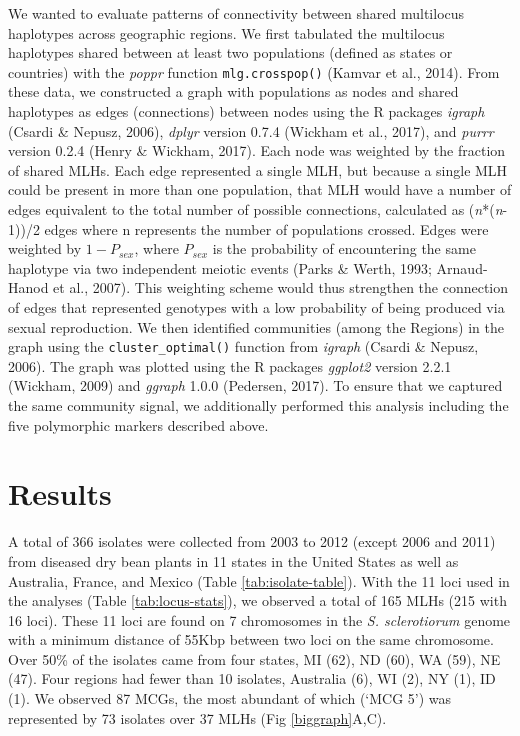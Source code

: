 \documentclass[fleqn,10pt,lineno]{wlpeerj} %
\theoremstyle{definition}
\theoremstyle{definition}
\theoremstyle{definition}
\theoremstyle{remark}
\begin{document}
We wanted to evaluate patterns of connectivity between shared multilocus
haplotypes across geographic regions. We first tabulated the multilocus
haplotypes shared between at least two populations (defined as states or
countries) with the \emph{poppr} function \texttt{mlg.crosspop()}
(Kamvar et al., 2014). From these data, we constructed a graph with
populations as nodes and shared haplotypes as edges (connections)
between nodes using the R packages \emph{igraph} (Csardi \& Nepusz,
2006), \emph{dplyr} version 0.7.4 (Wickham et al., 2017), and
\emph{purrr} version 0.2.4 (Henry \& Wickham, 2017). Each node was
weighted by the fraction of shared MLHs. Each edge represented a single
MLH, but because a single MLH could be present in more than one
population, that MLH would have a number of edges equivalent to the
total number of possible connections, calculated as
(\emph{n}*(\emph{n}-1))/2 edges where n represents the number of
populations crossed. Edges were weighted by \(1-P_{sex}\), where
\(P_{sex}\) is the probability of encountering the same haplotype via
two independent meiotic events (Parks \& Werth, 1993; Arnaud-Hanod et
al., 2007). This weighting scheme would thus strengthen the connection
of edges that represented genotypes with a low probability of being
produced via sexual reproduction. We then identified communities (among
the Regions) in the graph using the \texttt{cluster\_optimal()} function
from \emph{igraph} (Csardi \& Nepusz, 2006). The graph was plotted using
the R packages \emph{ggplot2} version 2.2.1 (Wickham, 2009) and
\emph{ggraph} 1.0.0 (Pedersen, 2017). To ensure that we captured the
same community signal, we additionally performed this analysis including
the five polymorphic markers described above.

\section*{Results}\label{results}

A total of 366 isolates were collected from 2003 to 2012 (except 2006
and 2011) from diseased dry bean plants in 11 states in the United
States as well as Australia, France, and Mexico (Table
\ref{tab:isolate-table}). With the 11 loci used in the analyses (Table
\ref{tab:locus-stats}), we observed a total of 165 MLHs (215 with 16
loci). These 11 loci are found on 7 chromosomes in the \emph{S.
sclerotiorum} genome with a minimum distance of 55Kbp between two loci
on the same chromosome. Over 50\% of the isolates came from four states,
MI (62), ND (60), WA (59), NE (47). Four regions had fewer than 10
isolates, Australia (6), WI (2), NY (1), ID (1). We observed 87 MCGs,
the most abundant of which (`MCG 5') was represented by 73 isolates over
37 MLHs (Fig \ref{biggraph}A,C).
\end{document}
